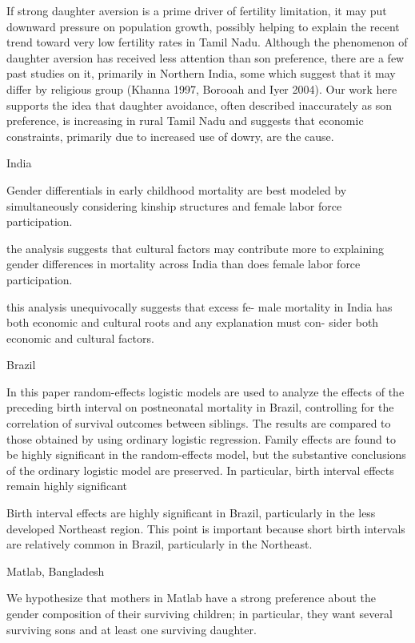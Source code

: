 If strong daughter aversion is a prime driver of fertility limitation, it may put downward pressure on population growth, possibly helping to explain the recent trend toward very low fertility rates in Tamil Nadu. Although the phenomenon of daughter aversion has received less attention than son preference, there are a few past studies on it, primarily in Northern India, some which suggest that it may differ by religious group (Khanna 1997, Borooah and Iyer 2004). Our work here supports the idea that daughter avoidance, often described inaccurately as son preference, is increasing in rural Tamil Nadu and suggests that economic constraints, primarily due to increased use of dowry, are the cause.

\citep{Kishor1993}

India

Gender differentials in early childhood
mortality are best modeled by simultaneously
considering kinship structures and female labor force participation.

the analysis suggests that cultural factors may contribute more to explaining gender
differences in mortality across India than does female labor force participation.

this analysis unequivocally suggests that excess fe-
male mortality in India has both economic and
cultural roots and any explanation must con-
sider both economic and cultural factors.

\citep{Curtis1993}

Brazil

In this paper random-effects logistic models are used to analyze the effects of the
preceding birth interval on postneonatal mortality in Brazil, controlling for the
correlation of survival outcomes between siblings. The results are compared to those
obtained by using ordinary logistic regression. Family effects are found to be highly
significant in the random-effects model, but the substantive conclusions of the
ordinary logistic model are preserved. In particular, birth interval effects remain
highly significant

Birth interval effects are highly significant in Brazil, particularly in the less developed
Northeast region. This point is important because short birth intervals are relatively common
in Brazil, particularly in the Northeast.


\citep{Rahman1993}

Matlab, Bangladesh

We hypothesize that mothers in Matlab have a strong preference about the gender composition of their surviving children; in particular, they want several surviving sons and at least one surviving daughter.

